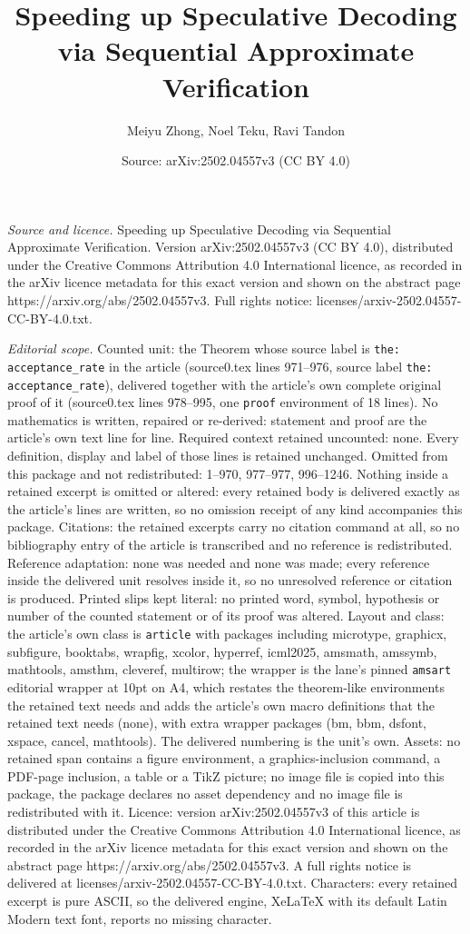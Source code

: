 \documentclass[10pt,a4paper]{amsart}
\title[Speeding up Speculative Decoding via Sequential Approximate ]{Speeding up Speculative Decoding via Sequential Approximate Verification}
\author{Meiyu Zhong, Noel Teku, Ravi Tandon}
\date{Source: arXiv:2502.04557v3 (CC BY 4.0)}
\begin{document}
\maketitle

\noindent\emph{Source and licence.} Speeding up Speculative Decoding via Sequential Approximate Verification. Version arXiv:2502.04557v3 (CC BY 4.0), distributed under the Creative Commons Attribution 4.0 International licence, as recorded in the arXiv licence metadata for this exact version and shown on the abstract page https://arxiv.org/abs/2502.04557v3. Full rights notice: licenses/arxiv-2502.04557-CC-BY-4.0.txt.\par\smallskip

\noindent\textit{Editorial scope.} Counted unit: the Theorem whose source label is \texttt{the: acceptance\_rate} in the article (source0.tex lines 971--976, source label \texttt{the: acceptance\_rate}), delivered together with the article's own complete original proof of it (source0.tex lines 978--995, one \texttt{proof} environment of 18 lines). No mathematics is written, repaired or re-derived: statement and proof are the article's own text line for line. Required context retained uncounted: none. Every definition, display and label of those lines is retained unchanged. Omitted from this package and not redistributed: 1--970, 977--977, 996--1246. Nothing inside a retained excerpt is omitted or altered: every retained body is delivered exactly as the article's lines are written, so no omission receipt of any kind accompanies this package. Citations: the retained excerpts carry no citation command at all, so no bibliography entry of the article is transcribed and no reference is redistributed. Reference adaptation: none was needed and none was made; every reference inside the delivered unit resolves inside it, so no unresolved reference or citation is produced. Printed slips kept literal: no printed word, symbol, hypothesis or number of the counted statement or of its proof was altered. Layout and class: the article's own class is \texttt{article} with packages including microtype, graphicx, subfigure, booktabs, wrapfig, xcolor, hyperref, icml2025, amsmath, amssymb, mathtools, amsthm, cleveref, multirow; the wrapper is the lane's pinned \texttt{amsart} editorial wrapper at 10pt on A4, which restates the theorem-like environments the retained text needs and adds the article's own macro definitions that the retained text needs (none), with extra wrapper packages (bm, bbm, dsfont, xspace, cancel, mathtools). The delivered numbering is the unit's own. Assets: no retained span contains a figure environment, a graphics-inclusion command, a PDF-page inclusion, a table or a TikZ picture; no image file is copied into this package, the package declares no asset dependency and no image file is redistributed with it. Licence: version arXiv:2502.04557v3 of this article is distributed under the Creative Commons Attribution 4.0 International licence, as recorded in the arXiv licence metadata for this exact version and shown on the abstract page https://arxiv.org/abs/2502.04557v3. A full rights notice is delivered at licenses/arxiv-2502.04557-CC-BY-4.0.txt. Characters: every retained excerpt is pure ASCII, so the delivered engine, XeLaTeX with its default Latin Modern text font, reports no missing character.
\end{document}
